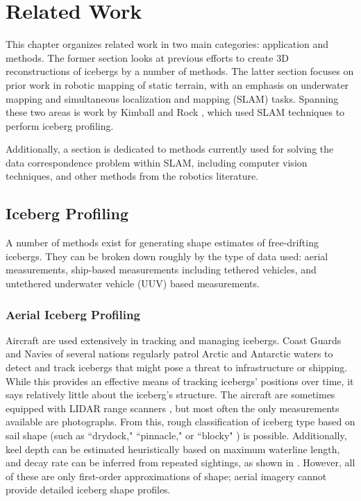 
\chapter{Related Work}
\label{ch.RelatedWork}

This chapter organizes related work in two main categories: application and methods. The former section looks at previous efforts to create 3D reconstructions of icebergs by a number of methods. The latter section focuses on prior work in robotic mapping of static terrain, with an emphasis on underwater mapping and simultaneous localization and mapping (SLAM) tasks. Spanning these two areas is work by Kimball and Rock \cite{Kimball2011b}, which used SLAM techniques to perform iceberg profiling.

Additionally, a section is dedicated to methods currently used for solving the data correspondence problem within SLAM, including computer vision techniques, and other methods from the robotics literature.

\section{Iceberg Profiling}

A number of methods exist for generating shape estimates of free-drifting icebergs. They can be broken down roughly by the type of data used: aerial measurements, ship-based measurements including tethered vehicles, and untethered underwater vehicle (UUV) based measurements.

\subsection{Aerial Iceberg Profiling}

Aircraft are used extensively in tracking and managing icebergs. Coast Guards and Navies of several nations regularly patrol Arctic and Antarctic waters to detect and track icebergs that might pose a threat to infrastructure or shipping. While this provides an effective means of tracking icebergs' positions over time, it says relatively little about the iceberg's structure. The aircraft are sometimes equipped with LIDAR range scanners \cite{Bunkin2012}, but most often the only measurements available are photographs. From this, rough classification of iceberg type based on sail shape (such as ``drydock," ``pinnacle," or ``blocky" ) is possible. Additionally, keel depth can be estimated heuristically based on maximum waterline length, and decay rate can be inferred from repeated sightings, as shown in \cite{Barker2004}. However, all of these are only first-order approximations of shape; aerial imagery cannot provide detailed iceberg shape profiles. 


